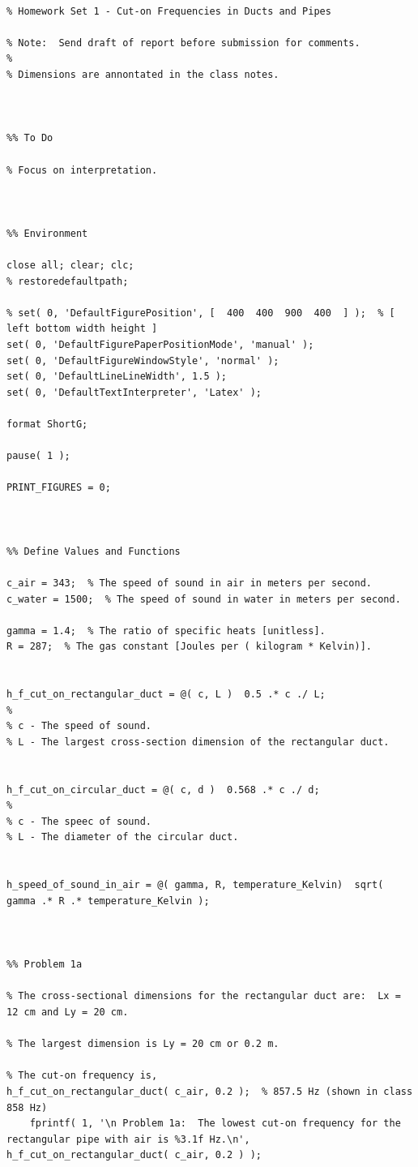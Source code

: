 \begin{lstlisting}[style=Matlab-editor, basicstyle=\mlttfamily, numbers=none, keepspaces, mlshowsectionrules]
%% Synopsis

% Homework Set 1 - Cut-on Frequencies in Ducts and Pipes

% Note:  Send draft of report before submission for comments.
%
% Dimensions are annontated in the class notes.



%% To Do

% Focus on interpretation.



%% Environment

close all; clear; clc;
% restoredefaultpath;

% set( 0, 'DefaultFigurePosition', [  400  400  900  400  ] );  % [ left bottom width height ]
set( 0, 'DefaultFigurePaperPositionMode', 'manual' );
set( 0, 'DefaultFigureWindowStyle', 'normal' );
set( 0, 'DefaultLineLineWidth', 1.5 );
set( 0, 'DefaultTextInterpreter', 'Latex' );

format ShortG;

pause( 1 );

PRINT_FIGURES = 0;



%% Define Values and Functions

c_air = 343;  % The speed of sound in air in meters per second.
c_water = 1500;  % The speed of sound in water in meters per second.

gamma = 1.4;  % The ratio of specific heats [unitless].
R = 287;  % The gas constant [Joules per ( kilogram * Kelvin)].


h_f_cut_on_rectangular_duct = @( c, L )  0.5 .* c ./ L;
%
% c - The speed of sound.
% L - The largest cross-section dimension of the rectangular duct.


h_f_cut_on_circular_duct = @( c, d )  0.568 .* c ./ d;
%
% c - The speec of sound.
% L - The diameter of the circular duct.


h_speed_of_sound_in_air = @( gamma, R, temperature_Kelvin)  sqrt( gamma .* R .* temperature_Kelvin );



%% Problem 1a

% The cross-sectional dimensions for the rectangular duct are:  Lx = 12 cm and Ly = 20 cm.

% The largest dimension is Ly = 20 cm or 0.2 m.

% The cut-on frequency is,
h_f_cut_on_rectangular_duct( c_air, 0.2 );  % 857.5 Hz (shown in class 858 Hz)
    fprintf( 1, '\n Problem 1a:  The lowest cut-on frequency for the rectangular pipe with air is %3.1f Hz.\n', h_f_cut_on_rectangular_duct( c_air, 0.2 ) );




\end{lstlisting}
